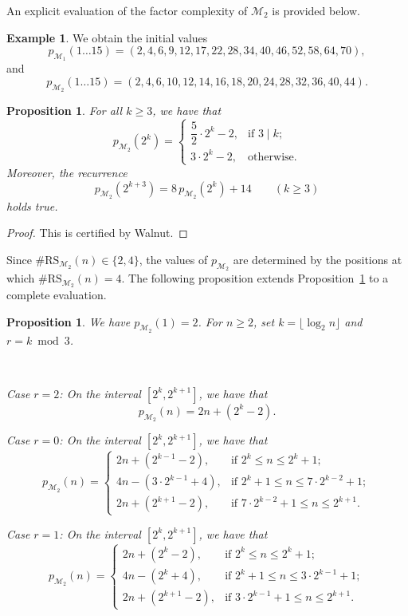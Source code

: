 \documentclass[12pt,reqno]{article}
\theoremstyle{plain}
\newtheorem{proposition}[theorem]{Proposition}
\theoremstyle{definition}
\newtheorem{example}[theorem]{Example}
\theoremstyle{remark}
\begin{document}
 An explicit evaluation of the factor complexity of $\mathcal{M}_{2}$ is provided below. 

\begin{example} 
 We obtain the initial values $$
 p_{\mathcal{M}_{1}}(1\ldots 15) = (2, 4, 6, 9, 12, 17, 22, 28, 34, 40, 46, 52, 58, 64, 70),
$$ and $$
 p_{\mathcal{M}_{2}}(1\ldots 15) = (2, 4, 6, 10, 12, 14, 16, 18, 20, 24, 28, 32, 36, 40, 44). $$
\end{example}

\begin{proposition}\label{propanotherrelabel} 
For all $k \geq 3$, we have that 
$$
 p_{\mathcal{M}_{2}}(2^k) =
 \begin{cases}
 \dfrac{5}{2}\cdot 2^k - 2, & \text{if } 3 \mid k; \\ 
 3 \cdot 2^k - 2, & \text{otherwise.} 
 \end{cases}
$$ Moreover, the recurrence $$
 p_{\mathcal{M}_{2}}(2^{k+3}) = 8\, p_{\mathcal{M}_{2}}(2^k) + 14 \qquad (k \geq 3) $$
 holds true. 
\end{proposition}

\begin{proof}
 This is certified by Walnut. 
\end{proof}

 Since $\#\mathrm{RS}_{\mathcal{M}_{2}}(n)\in\{2,4\}$, the values of $p_{\mathcal{M}_{2}}$ are determined by the positions at which
 $\#\mathrm{RS}_{\mathcal{M}_{2}}(n) = 4$. The following proposition extends Proposition~\ref{propanotherrelabel} to a 
 complete evaluation.

\begin{proposition}
We have $p_{\mathcal{M}_{2}}(1)=2$. For $n \geq 2$, set $k = \lfloor \log_2 n \rfloor$ and $r = k \bmod 3$.

 \ 

\noindent\emph{Case $r = 2$:} On the interval $[2^k, 2^{k+1}]$, we have that $$ p_{\mathcal{M}_{2}}(n) = 2n + (2^k - 
 2). $$

\noindent\emph{Case $r = 0$:} On the interval $ [2^k, 2^{k+1}]$, we have that 
$$ p_{\mathcal{M}_{2}}(n) = 
 \begin{cases}
 2n + (2^{k-1} - 2), & \text{if } 2^k \leq n \leq 2^k + 1; \\ 
 4n - (3 \cdot 2^{k-1} + 4), & \text{if } 2^k + 1 \leq n \leq 7 \cdot 2^{k-2} + 1; \\ 
 2n + (2^{k+1} - 2), & \text{if } 7 \cdot 2^{k-2} + 1 \leq n \leq 2^{k+1}.
 \end{cases} $$

\noindent\emph{Case $r = 1$:} On the interval $ [2^k, 2^{k+1}]$, 
 we have that $$ p_{\mathcal{M}_{2}}(n) = 
 \begin{cases}
 2n + (2^k - 2), & \text{if } 2^k \leq n \leq 2^k + 1; \\ 
 4n - (2^k + 4), & \text{if } 2^k + 1 \leq n \leq 3 \cdot 2^{k-1} + 1; \\ 
 2n + (2^{k+1} - 2), & \text{if } 3 \cdot 2^{k-1} + 1 \leq n \leq 2^{k+1}. 
 \end{cases}
$$
\end{proposition}
\end{document}
